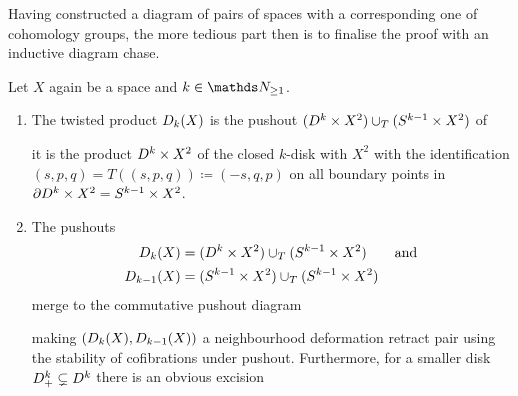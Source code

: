 Having constructed a diagram of pairs of spaces with a corresponding
one of cohomology groups, the more tedious part then is to finalise
the proof with an inductive diagram chase.

\begin{Fact}
  Let $X$ again be a space and $k\in\Nat_{\geq1}$.
  \begin{enumerate}
  \item
    The twisted product $D_{k}({X})$ is the pushout
    $(D^{k}\times X^2)\cup_{T}(S^{k-1}\times X^2)$ of
    \begin{center}
    \end{center}
    \idest it is the product $D^{k}\times X^2$ of the closed
    $k$-disk with $X^2$ with the identification
    $(s,p,q)=T((s,p,q))\coloneqq(-s,q,p)$ on all boundary points in
    $\partial{D^{k}\times X^2}=S^{k-1}\times X^2$.
  \item
    The pushouts
    \begin{align*}
      D_{k}({X})
      &=(D^{k}\times X^2)\cup_{T}(S^{k-1}\times X^2)
        \qquad\text{and}\\
      D_{k-1}({X})
      &=(S^{k-1}\times X^2)\cup_{T}(S^{k-1}\times X^2)
    \end{align*}
    merge to the commutative pushout diagram
    \begin{center}
    \end{center}
    making $(D_{k}({X}), D_{k-1}({X}))$ a neighbourhood
    deformation retract pair using the stability of cofibrations under pushout.
    Furthermore, for a smaller disk $D^{k}_+\subsetneq D^{k}$
    there is an obvious excision
    \begin{gather*}

\end{gather*}
\end{enumerate}
\end{Fact}
